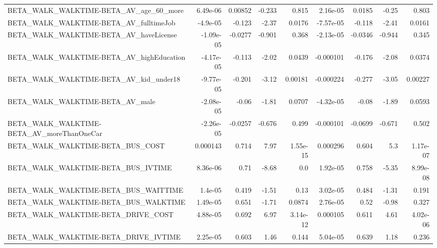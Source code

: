\begin{tabular}{lrrrrrrrr}
BETA\_WALK\_WALKTIME-BETA\_AV\_age\_60\_more             &    6.49e-06 &      0.00852 &   -0.233 &    0.815 &   2.16e-05 &      0.0185 &        -0.25 &         0.803 \\
BETA\_WALK\_WALKTIME-BETA\_AV\_fulltimeJob             &    -4.9e-05 &       -0.123 &    -2.37 &   0.0176 &  -7.57e-05 &      -0.118 &        -2.41 &        0.0161 \\
BETA\_WALK\_WALKTIME-BETA\_AV\_haveLicense             &   -1.09e-05 &      -0.0277 &   -0.901 &    0.368 &  -2.13e-05 &     -0.0346 &       -0.944 &         0.345 \\
BETA\_WALK\_WALKTIME-BETA\_AV\_highEducation           &   -4.17e-05 &       -0.113 &    -2.02 &   0.0439 &  -0.000101 &      -0.176 &        -2.08 &        0.0374 \\
BETA\_WALK\_WALKTIME-BETA\_AV\_kid\_under18             &   -9.77e-05 &       -0.201 &    -3.12 &  0.00181 &  -0.000224 &      -0.277 &        -3.05 &       0.00227 \\
BETA\_WALK\_WALKTIME-BETA\_AV\_male                    &   -2.08e-05 &        -0.06 &    -1.81 &   0.0707 &  -4.32e-05 &       -0.08 &        -1.89 &        0.0593 \\
BETA\_WALK\_WALKTIME-BETA\_AV\_moreThanOneCar          &   -2.26e-05 &      -0.0257 &   -0.676 &    0.499 &  -0.000101 &     -0.0699 &       -0.671 &         0.502 \\
BETA\_WALK\_WALKTIME-BETA\_BUS\_COST                   &    0.000143 &        0.714 &     7.97 & 1.55e-15 &   0.000296 &       0.604 &          5.3 &      1.17e-07 \\
BETA\_WALK\_WALKTIME-BETA\_BUS\_IVTIME                 &    8.36e-06 &         0.71 &    -8.68 &      0.0 &   1.92e-05 &       0.758 &        -5.35 &      8.99e-08 \\
BETA\_WALK\_WALKTIME-BETA\_BUS\_WAITTIME               &     1.4e-05 &        0.419 &    -1.51 &     0.13 &   3.02e-05 &       0.484 &        -1.31 &         0.191 \\
BETA\_WALK\_WALKTIME-BETA\_BUS\_WALKTIME               &    1.49e-05 &        0.651 &    -1.71 &   0.0874 &   2.76e-05 &        0.52 &        -0.98 &         0.327 \\
BETA\_WALK\_WALKTIME-BETA\_DRIVE\_COST                 &    4.88e-05 &        0.692 &     6.97 & 3.14e-12 &   0.000105 &       0.611 &         4.61 &      4.02e-06 \\
BETA\_WALK\_WALKTIME-BETA\_DRIVE\_IVTIME               &    2.25e-05 &        0.603 &     1.46 &    0.144 &   5.04e-05 &       0.639 &         1.18 &         0.236 \\

\end{tabular}
